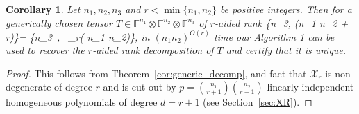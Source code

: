 \documentclass[11pt]{article}
\newtheorem{cor}[theorem]{Corollary}
\theoremstyle{definition}
\newcommand{\field}{\mathbb{F}}
\newcommand\X{\mathcal{X}}
\def\ba#1\ea{\begin{align}#1\end{align}}
\begin{document}
\begin{cor} \label{cor:block_decomp}
Let $n_1,n_2,n_3$ and $r < \min \{n_1,n_2\}$ be positive integers. Then %
for a generically chosen tensor $T\in {\field^{n_1}\otimes \field^{n_2} \otimes \field^{n_3}}$ of $r$-aided rank
\ba
R \leq \min\Bigg\{n_3, (n_1 n_2 + r)\Bigg\}=  \min\big\{n_3~, ~\Omega_r( n_1 n_2)\big\},
\ea
in $(n_1 n_2)^{O(r)}$ time our Algorithm 1 can be used to recover the $r$-aided rank decomposition of $T$ and certify that it is unique.
\end{cor}
\begin{proof}
This follows from Theorem~\ref{cor:generic_decomp}, and fact that $\X_r$ is non-degenerate of degree $r$ and is cut out by $p=\binom{n_1}{r+1}\binom{n_2}{r+1}$ linearly independent homogeneous polynomials of degree $d=r+1$ (see Section~\ref{sec:XR}).
\end{proof}


%
%




\appendix 



%
\end{document}
